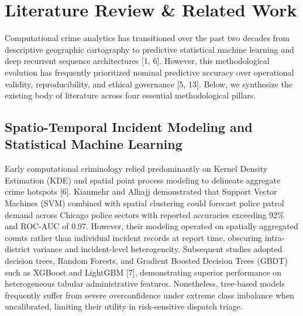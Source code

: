 \documentclass[runningheads]{llncs}
\begin{document}
\section{Literature Review \& Related Work}
Computational crime analytics has transitioned over the past two decades from descriptive geographic cartography to predictive statistical machine learning and deep recurrent sequence architectures [1, 6]. However, this methodological evolution has frequently prioritized nominal predictive accuracy over operational validity, reproducibility, and ethical governance [5, 13]. Below, we synthesize the existing body of literature across four essential methodological pillars.

\subsection{Spatio-Temporal Incident Modeling and Statistical Machine Learning}
Early computational criminology relied predominantly on Kernel Density Estimation (KDE) and spatial point process modeling to delineate aggregate crime hotspots [6]. Kianmehr and Alhajj demonstrated that Support Vector Machines (SVM) combined with spatial clustering could forecast police patrol demand across Chicago police sectors with reported accuracies exceeding 92\% and ROC-AUC of 0.97. However, their modeling operated on spatially aggregated counts rather than individual incident records at report time, obscuring intra-district variance and incident-level heterogeneity. Subsequent studies adopted decision trees, Random Forests, and Gradient Boosted Decision Trees (GBDT) such as XGBoost and LightGBM [7], demonstrating superior performance on heterogeneous tabular administrative features. Nonetheless, tree-based models frequently suffer from severe overconfidence under extreme class imbalance when uncalibrated, limiting their utility in risk-sensitive dispatch triage.
\end{document}
